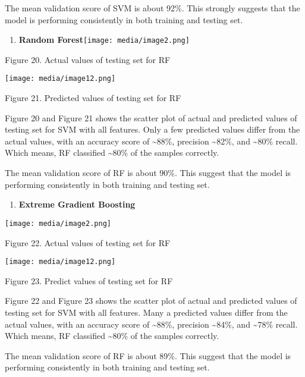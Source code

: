 \documentclass[
]{article}
\begin{document}
The mean validation score of SVM is about 92\%. This strongly suggests
that the model is performing consistently in both training and testing
set.

\begin{enumerate}
\def\labelenumi{\alph{enumi})}
\setcounter{enumi}{3}
\item
  \textbf{Random
  Forest}\texttt{[image: media/image2.png]}
\end{enumerate}

Figure 20. Actual values of testing set for RF

\texttt{[image: media/image12.png]}

Figure 21. Predicted values of testing set for RF

Figure 20 and Figure 21 shows the scatter plot of actual and predicted
values of testing set for SVM with all features. Only a few predicted
values differ from the actual values, with an accuracy score of
\textasciitilde88\%, precision \textasciitilde82\%, and
\textasciitilde80\% recall. Which means, RF classified
\textasciitilde80\% of the samples correctly.

The mean validation score of RF is about 90\%. This suggest that the
model is performing consistently in both training and testing set.

\begin{enumerate}
\def\labelenumi{\alph{enumi})}
\setcounter{enumi}{4}
\item
  \textbf{Extreme Gradient Boosting}
\end{enumerate}

\texttt{[image: media/image2.png]}

Figure 22. Actual values of testing set for RF

\texttt{[image: media/image12.png]}

Figure 23. Predict values of testing set for RF

Figure 22 and Figure 23 shows the scatter plot of actual and predicted
values of testing set for SVM with all features. Many a predicted values
differ from the actual values, with an accuracy score of
\textasciitilde88\%, precision \textasciitilde84\%, and
\textasciitilde78\% recall. Which means, RF classified
\textasciitilde80\% of the samples correctly.

The mean validation score of RF is about 89\%. This suggest that the
model is performing consistently in both training and testing set.
\end{document}
